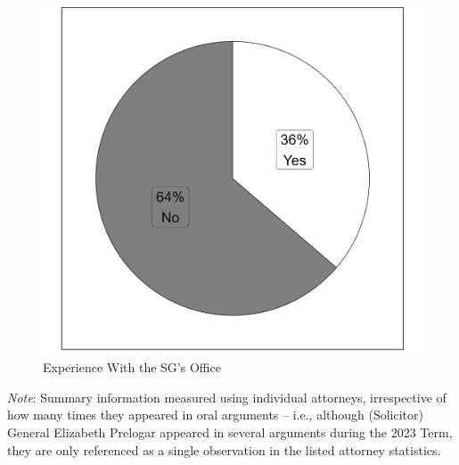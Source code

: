 \begin{landscape}
\begin{multicols}{3}
\begin{figure}[H]
    \end{figure}

    \begin{figure}[H]
        \centering
        \caption{Experience With the SG's Office}
        \vspace{2.5mm}
        \includegraphics[width=\linewidth]{Figures/statpack_figures/percentage_sg_experience.png}
    \end{figure}
\end{multicols}

\footnotesize{\emph{Note}: Summary information measured using individual attorneys, irrespective of how many times they appeared in oral arguments -- i.e., although (Solicitor) General Elizabeth Prelogar appeared in several arguments during the 2023 Term, they are only referenced as a single observation in the listed attorney statistics.}

\vfill

\end{landscape}

\newpage

